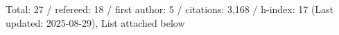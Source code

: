 Total: 27 / refereed: 18 / first author: 5 / citations: 3,168 / h-index: 17 (Last updated: 2025-08-29), List attached below